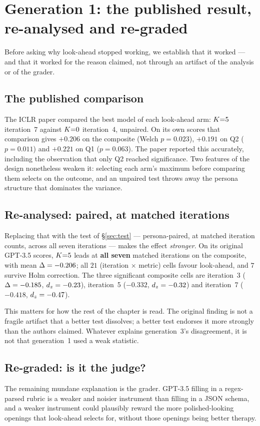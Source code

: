 \section{Generation 1: the published result, re-analysed and re-graded}
\label{sec:gen1}

Before asking why look-ahead stopped working, we establish that it worked --- and that it
worked for the reason claimed, not through an artifact of the analysis or of the grader.

\subsection{The published comparison}
The ICLR paper compared the best model of each look-ahead arm: $K{=}5$ iteration~7 against
$K{=}0$ iteration~4, unpaired. On its own scores that comparison gives $+0.206$ on the
composite (Welch $p = 0.023$), $+0.191$ on Q2 ($p = 0.011$) and $+0.221$ on Q1
($p = 0.063$). The paper reported this accurately, including the observation that only Q2
reached significance. Two features of the design nonetheless weaken it: selecting each arm's
maximum before comparing them selects on the outcome, and an unpaired test throws away the
persona structure that dominates the variance.

\subsection{Re-analysed: paired, at matched iterations}
Replacing that with the test of \S\ref{sec:test} --- persona-paired, at matched iteration
counts, across all seven iterations --- makes the effect \emph{stronger}. On its original
GPT-3.5 scores, $K{=}5$ leads at \textbf{all seven} matched iterations on the \QQ{} composite,
with mean $\Delta = -0.206$; all $21$ (iteration $\times$ metric) cells favour look-ahead, and
$7$ survive Holm correction. The three significant composite cells are iteration~3
($\Delta = -0.185$, $d_z = -0.23$), iteration~5 ($-0.332$, $d_z = -0.32$) and iteration~7
($-0.418$, $d_z = -0.47$).

This matters for how the rest of the chapter is read. The original finding is not a fragile
artifact that a better test dissolves; a better test endorses it more strongly than the
authors claimed. Whatever explains generation~3's disagreement, it is not that generation~1
used a weak statistic.

\subsection{Re-graded: is it the judge?}
\label{sec:regrade}
The remaining mundane explanation is the grader. GPT-3.5 filling in a regex-parsed rubric is
a weaker and noisier instrument than \primaryjudge{} filling in a JSON schema, and a weaker
instrument could plausibly reward the more polished-looking openings that look-ahead selects
for, without those openings being better therapy.

